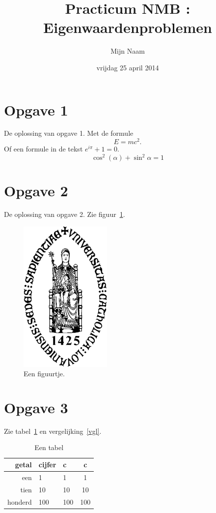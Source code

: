 \documentclass[a4paper]{article}
\title{Practicum NMB : Eigenwaardenproblemen}
\author{Mijn Naam}
\date{vrijdag 25 april 2014}
\newcommand{\opgave}[1]{\section*{Opgave #1}}
\begin{document}
\maketitle

\opgave{1}

De oplossing van opgave 1. Met de formule
\begin{equation*}
E = mc^2.
\end{equation*}
Of een formule in de tekst \(e^{i\pi} + 1 = 0\).
\begin{equation}
\label{vgl}
\cos^2(\alpha) + \sin^2\alpha = 1
\end{equation}

\opgave{2}

De oplossing van opgave 2. Zie figuur~\ref{figuurtje}.

\begin{figure}
\begin{center}
\includegraphics[width=0.4\textwidth]{sedes.pdf}
\end{center}
\caption{Een figuurtje.}
\label{figuurtje}
\end{figure}


\opgave{3}

Zie tabel~\ref{tab1} en vergelijking~\eqref{vgl}.

\begin{table}
\begin{center}
\begin{tabular}{r|llc}
getal & cijfer & c & c \\\hline
een & 1 & 1 & 1 \\
tien & 10 & 10 & 10 \\
honderd & 100 & 100 & 100
\end{tabular}
\end{center}
\caption{Een tabel}
\label{tab1}
\end{table}
\end{document}
